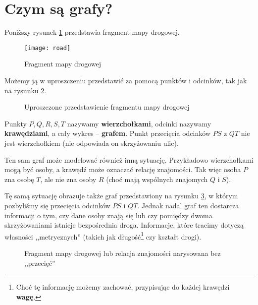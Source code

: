 \section{Czym są grafy?}

Poniższy rysunek \ref{fig:road} przedstawia fragment mapy drogowej. 

\begin{figure}[H]
\centering
\texttt{[image: road]}
\caption{Fragment mapy drogowej \cite[11]{wilson}}
\label{fig:road}
\end{figure}

Możemy ją w uproszczeniu przedstawić za pomocą punktów i odcinków, tak jak na rysunku \ref{fig:road-graph}.

\begin{figure}[H]
\centering
{}
\caption{Uproszczone przedstawienie fragmentu mapy drogowej} \label{fig:road-graph}
\end{figure}

Punkty $P,Q,R,S,T$ nazywamy \textbf{wierzchołkami}, odcinki nazywamy \textbf{krawędziami}, a cały wykres -- \textbf{grafem}. Punkt przecięcia odcinków $PS$ z $QT$ nie jest wierzchołkiem (nie odpowiada on skrzyżowaniu ulic).

Ten sam graf może modelować również inną sytuację. Przykładowo wierzchołkami mogą być osoby, a krawędź może oznaczać relację znajomości. Tak więc osoba $P$ zna osobę $T$, ale nie zna osoby $R$ (choć mają wspólnych znajomych $Q$ i $S$). 

Tę samą sytuację obrazuje także graf przedstawiony na rysunku \ref{fig:road-graph-alt}, w którym pozbyliśmy się przecięcia odcinków $PS$ i $QT$. Jednak nadal graf ten dostarcza informacji o tym, czy dane osoby znają się lub czy pomiędzy dwoma skrzyżowaniami istnieje bezpośrednia droga. Informacje, które tracimy dotyczą własności ,,metrycznych'' (takich jak długość\footnote{Choć tę informację możemy zachować, przypisując do każdej krawędzi \textbf{wagę}.} czy kształt drogi).  

\begin{figure}[H]
\centering
{}
\captionsetup{justification=centering}
\caption{Fragment mapy drogowej lub relacja znajomości narysowana bez ,,przecięć''} \label{fig:road-graph-alt}
\end{figure}

